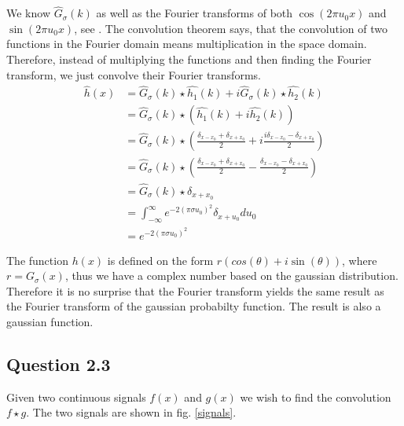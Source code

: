 \documentclass[a4paper, 10pt, final]{article}
\begin{document}
We know $\hat{G}_{\sigma}(k)$ as well as the Fourier transforms of both
$\cos(2\pi u_0 x)$ and $\sin(2\pi u_0 x)$, see \citet[p.
557]{jahne-digital}. The convolution theorem says, that the convolution
of two functions in the Fourier domain means multiplication in the space
domain. Therefore, instead of multiplying the functions and then finding
the Fourier transform, we just convolve their Fourier transforms.
\begin{align}
    \hat{h}(x) & = \hat{G}_{\sigma}(k) \star \hat{h_1}(k) + i\hat{G}_{\sigma}(k) \star \hat{h_2}(k)\\
     & = \hat{G}_{\sigma}(k) \star (\hat{h_1}(k) + i\hat{h_2}(k))\\
     & = \hat{G}_{\sigma}(k) \star \left(\frac{\delta_{x - x_0} + \delta_{x + x_0}}{2} + i\frac{i\delta_{x - x_0} - \delta_{x + x_0}}{2}\right)\\
     & = \hat{G}_{\sigma}(k) \star \left(\frac{\delta_{x - x_0} + \delta_{x + x_0}}{2} - \frac{\delta_{x - x_0} - \delta_{x + x_0}}{2}\right)\\
     & = \hat{G}_{\sigma}(k) \star \delta_{x + x_0}\\
     & = \int_{-\infty}^{\infty}{e^{-2(\pi\sigma u_0)^2}\delta_{x + u_0}du_0}\\
     & = e^{-2(\pi\sigma u_0)^2}
\end{align}

The function $h(x)$ is defined on the form $r(cos(\theta) +
i\sin(\theta))$, where $r = G_{\sigma}(x)$, thus we have a complex
number based on the gaussian distribution. Therefore it is no surprise
that the Fourier transform yields the same result as the Fourier
transform of the gaussian probabilty function. The result is also a
gaussian function.

\subsection*{Question 2.3}
Given two continuous signals $f(x)$ and $g(x)$ we wish to find the
convolution $f \star g$. The two signals are shown in fig.
\ref{signals}.
\end{document}
